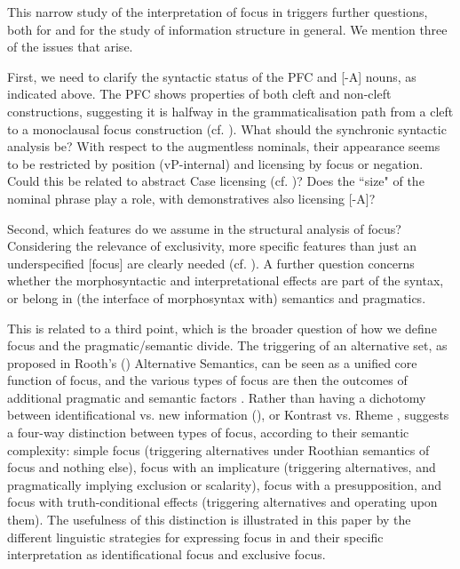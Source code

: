 \documentclass[output=paper]{langsci/langscibook}
\begin{document}
This narrow study of the interpretation of focus in  triggers further questions, both for  and for the study of information structure in general. We mention three of the issues that arise.

First, we need to clarify the syntactic status of the PFC and [-A] nouns, as indicated above. The PFC shows properties of both cleft and non-cleft constructions, suggesting it is halfway in the grammaticalisation path from a cleft to a monoclausal focus construction (cf. \citealt{HeineReh1983,HarrisCampbell1995,VanderWalManiacky2015}). What should the synchronic syntactic analysis be? With respect to the augmentless nominals, their appearance seems to be restricted by position (vP-internal) and licensing by focus or negation. Could this be related to abstract Case licensing (cf. \citealt{Halpert2012,Halpert2013,CarstensMletshe2015,CarstensMletshe2016})? Does the ``size" of the nominal phrase play a role, with demonstratives also licensing [-A]?

Second, which features do we assume in the structural analysis of focus? Considering the relevance of exclusivity, more specific features than just an underspecified [focus] are clearly needed (cf. \citealt{NeelemanEtAl2009}). A further question concerns whether the morphosyntactic and interpretational effects are part of the syntax, or belong in (the interface of morphosyntax with) semantics and pragmatics.

This is related to a third point, which is the broader question of how we define focus and the pragmatic/semantic divide. The triggering of an alternative set, as proposed in Rooth’s (\citeyear*{Rooth1985,Rooth1992,Rooth1996}) Alternative Semantics, can be seen as a unified core function of focus, and the various types of focus are then the outcomes of additional pragmatic and semantic factors \citep{ZimmermannOnea2011}. Rather than having a dichotomy between identificational vs. new information (\citealt{Kiss1998}), or Kontrast vs. Rheme \citep{VallduviVilkuna1998}, \citet{Bazalgette2015} suggests a four-way distinction between types of focus, according to their semantic complexity: simple focus (triggering alternatives under Roothian semantics of focus and nothing else), focus with an implicature (triggering alternatives, and pragmatically implying exclusion or scalarity), focus with a presupposition, and focus with truth-conditional effects (triggering alternatives and operating upon them). The usefulness of this distinction is illustrated in this paper by the different linguistic strategies for expressing focus in  and their specific interpretation as identificational focus and exclusive focus.
\end{document}
